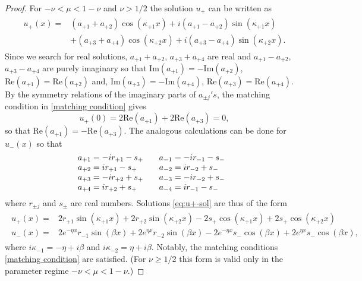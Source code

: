 \documentclass{article}
\numberwithin{equation}{section}
\begin{document}
		\begin{proof} 
		For $-\nu < \mu < 1-\nu$ and $\nu>1/2$ the solution $u_+$ can be written as
		\begin{align}
			\begin{split}
				u_+(x) =& (a_{+1} + a_{+2}) \cos (\kappa_{+1} x) + i ( a_{+1} - a_{+2} ) \sin (\kappa_{+1} x) \\
				&+ ( a_{+3} + a_{+4}) \cos (\kappa_{+2} x) + i ( a_{+3} - a_{+4}) \sin (\kappa_{+2} x) .
			\end{split}
		\end{align}
		Since we search for real solutions, $a_{+1} + a_{+2}$, $ a_{+3} + a_{+4}$ are real and $a_{+1} - a_{+2}$, $a_{+3} - a_{+4}$ are purely imaginary so that $\mathrm{Im}(a_{+1}) = -\mathrm{Im}(a_{+2})$, $\mathrm{Re}(a_{+1}) = \mathrm{Re}(a_{+2})$ and, $\mathrm{Im}(a_{+3}) = -\mathrm{Im}(a_{+4})$, $\mathrm{Re}(a_{+3}) = \mathrm{Re}(a_{+4})$. By the symmetry relations of the imaginary parts of $a_{\pm j}'s$, the matching condition in \eqref{matching condition} gives
		\begin{equation}
			u_+(0) = 2 \mathrm{Re} (a_{+1}) + 2 \mathrm{Re} (a_{+3}) = 0, 
		\end{equation}
		so that $\mathrm{Re}(a_{+1}) = -\mathrm{Re}(a_{+3})$.
		The analogous calculations can be done for $u_{-}(x)$  
		so that 
		\begin{equation}
			\begin{tabular}{p{0.25\linewidth} p{0.25\linewidth}}
				\parbox{\linewidth}{$a_{+1} = -i r_{+1} - s_+ $ \\ $a_{+2} = i r_{+1} - s_+ $ \\ $a_{+3} = -i r_{+2} + s_+ $ \\ $a_{+4} = i r_{+2} + s_+ $}&
				\parbox{\linewidth}{$a_{-1} = -i r_{-1} - s_- $ \\ $a_{-2} = i r_{-2} + s_- $ \\ $a_{-3} = -i r_{-2} + s_- $ \\ $a_{-4} = i r_{-1} - s_- $}
			\end{tabular}
		\end{equation}
		where $r_{\pm j}$ and $s_{\pm}$ are real numbers. Solutions \eqref{eq:u+-sol}  
		are thus of the form
		\begin{align}\label{new u's}
			\begin{split}
				u_+(x) =& 2 r_{+1} \sin(\kappa_{+1}x) + 2 r_{+2} \sin(\kappa_{+2}x)  -2 s_+ \cos(\kappa_{+1}x) + 2 s_+ \cos(\kappa_{+2}x)\\
				u_-(x) =& 2 e^{-\eta x} r_{-1} \sin(\beta x) + 2 e^{\eta x} r_{-2} \sin(\beta x) -2 e^{-\eta x} s_- \cos(\beta x) + 2 e^{\eta x} s_- \cos(\beta x),
			\end{split}
		\end{align} 
		where $i \kappa_{-1} = -\eta + i \beta$ and $i \kappa_{-2} = \eta + i \beta$. Notably, the matching conditions \eqref{matching condition} are satisfied. (For $\nu\geq 1/2$ this form is valid only in the parameter regime $-\nu < \mu < 1-\nu$.) 
		 

\end{proof}
\end{document}
